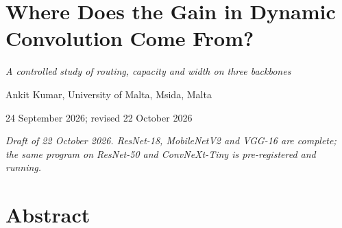 \documentclass{article}
\begin{document}
\section*{Where Does the Gain in Dynamic Convolution Come From?}

\emph{A controlled study of routing, capacity and width on three backbones}

Ankit Kumar, University of Malta, Msida, Malta

24 September 2026; revised 22 October 2026

\emph{Draft of 22 October 2026. ResNet-18, MobileNetV2 and VGG-16 are complete; the same program on ResNet-50 and ConvNeXt-Tiny is pre-registered and running.}

\section*{Abstract}
\end{document}
